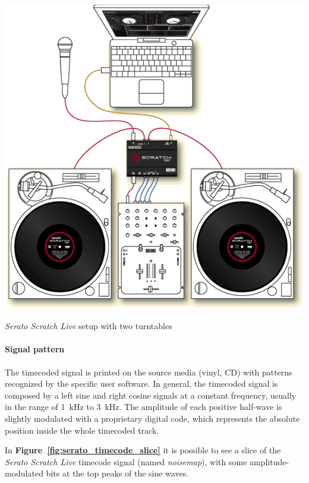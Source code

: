 \documentclass[a4paper,10pt]{article}
\makeatletter
\newenvironment{figurehere}{\def\@captype{figure}\vspace{2ex}}{\vspace{2ex}}
\newcommand{\citef}[1]{\textbf{Figure~\ref{#1}}}
\makeatother
\begin{document}
\begin{multicols}{2}
\begin{figurehere}
	\centering
	\includegraphics[keepaspectratio=true,width=0.9\columnwidth]{images/serato_setup.pdf}
	\caption{\emph{Serato Scratch Live} setup with two turntables}
	\label{fig:serato_setup}
\end{figurehere}


\paragraph{Signal pattern}
The timecoded signal is printed on the source media (vinyl, CD) with
patterns recognized by the specific user software. In general, the timecoded
signal is composed by a left sine and right cosine signals at a constant
frequency, usually in the range of 1~kHz to 3~kHz. The amplitude of each
positive half-wave is slightly modulated with a proprietary digital code,
which represents the absolute position inside the whole timecoded track.

In \citef{fig:serato_timecode_slice} it is possible to see a slice of the
\emph{Serato Scratch Live} \cite{rane_ssl} timecode signal (named
\emph{noisemap}), with some amplitude-modulated bits at the top peaks of
the sine waves.


\end{multicols}
\end{document}
